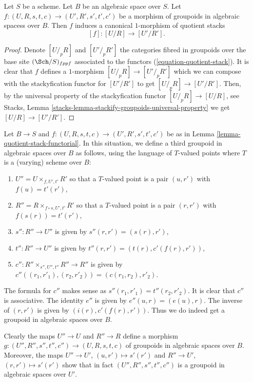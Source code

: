 \begin{lemma}
\label{lemma-quotient-stack-functorial}
Let $S$ be a scheme. Let $B$ be an algebraic space over $S$.
Let $f : (U, R, s, t, c) \to (U', R', s', t', c')$ be a morphism of
groupoids in algebraic spacess over $B$.
Then $f$ induces a canonical $1$-morphism of quotient stacks
$$
[f] : [U/R] \longrightarrow [U'/R'].
$$
\end{lemma}

\begin{proof}
Denote $[U/_{\!p}R]$ and $[U'/_{\!p}R']$ the categories fibred
in groupoids over the base site $(\Sch/S)_{fppf}$ associated to the
functors (\ref{equation-quotient-stack}). It is clear that $f$ defines
a $1$-morphism $[U/_{\!p}R] \to [U'/_{\!p}R']$ which we can compose
with the stackyfication functor for $[U'/R']$ to get $[U/_{\!p}R] \to [U'/R']$.
Then, by the universal property of the stackyfication functor
$[U/_{\!p}R] \to [U/R]$, see
Stacks, Lemma \ref{stacks-lemma-stackify-groupoids-universal-property}
we get $[U/R] \to [U'/R']$.
\end{proof}

\noindent
Let $B \to S$ and $f : (U, R, s, t, c) \to (U', R', s', t', c')$ be as in
Lemma \ref{lemma-quotient-stack-functorial}.
In this situation, we define a third groupoid in algebraic spaces over
$B$ as follows, using the language of $T$-valued points where $T$
is a (varying) scheme over $B$:
\begin{enumerate}
\item $U'' = U \times_{f, U', t'} R'$ so that a $T$-valued point is
a pair $(u, r')$ with $f(u) = t'(r')$,
\item $R'' = R \times_{f \circ s, U', t'} R'$ so that a $T$-valued point is
a pair $(r, r')$ with $f(s(r)) = t'(r')$,
\item $s'' : R'' \to U''$ is given by $s''(r, r') = (s(r), r')$,
\item $t'' : R'' \to U''$ is given by $t''(r, r') = (t(r), c'(f(r), r'))$,
\item $c'' : R'' \times_{s'', U'', t''} R'' \to R''$ is given by
$c''((r_1, r'_1), (r_2, r'_2)) = (c(r_1, r_2), r'_2)$.
\end{enumerate}
The formula for $c''$ makes sense as $s''(r_1, r'_1) = t''(r_2, r'_2)$.
It is clear that $c''$ is associative. The identity $e''$ is given by
$e''(u, r) = (e(u), r)$. The inverse of $(r, r')$ is given by
$(i(r), c'(f(r), r'))$. Thus we do indeed get a groupoid
in algebraic spaces over $B$.

\medskip\noindent
Clearly the maps $U'' \to U$ and $R'' \to R$ define a morphism
$g : (U'', R'', s'', t'', c'') \to (U, R, s, t, c)$
of groupoids in algebraic spaces over $B$. Moreover, the maps
$U'' \to U'$, $(u, r') \mapsto s'(r')$ and
$R'' \to U'$, $(r, r') \mapsto s'(r')$ show that in fact
$(U'', R'', s'', t'', c'')$ is a groupoid in algebraic spaces over $U'$.

